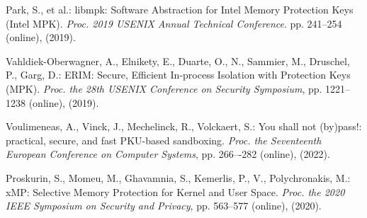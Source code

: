 \documentclass[english,sigrecommended,JIP]{ipsj}
\begin{document}
\begin{thebibliography}{99}
    Park, S., et al.: libmpk: Software Abstraction for Intel Memory Protection Keys (Intel MPK).
    \textit{Proc. 2019 USENIX Annual Technical Conference}. pp. 241--254 (online), (2019).    
    

  Vahldiek-Oberwagner, A., Elnikety, E., Duarte, O., N., Sammier, M., Druschel, P., Garg, D.: ERIM: Secure, Efficient In-process Isolation with Protection Keys (MPK). \textit{Proc. the 28th USENIX Conference on Security Symposium}, pp. 1221--1238 (online),  (2019). 

Voulimeneas, A., Vinck, J., Mechelinck, R., Volckaert, S.: You shall not (by)pass!: practical, secure, and fast PKU-based sandboxing.
\textit{Proc. the Seventeenth European Conference on Computer Systems}, pp. 266–-282 (online),  (2022).


  Proskurin, S., Momeu, M., Ghavamnia, S., Kemerlis, P., V., Polychronakis, M.: xMP: Selective Memory Protection for Kernel and User Space.
  \textit{Proc. the 2020 IEEE Symposium on Security and Privacy}, pp. 563--577 (online),   (2020).


\end{thebibliography}
\end{document}
